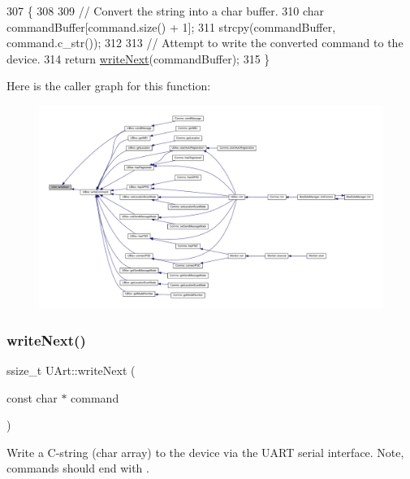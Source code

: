 \begin{DoxyCode}
307 \{
308 
309     \textcolor{comment}{// Convert the string into a char buffer.}
310     \textcolor{keywordtype}{char} commandBuffer[command.size() + 1];
311     strcpy(commandBuffer, command.c\_str());
312 
313     \textcolor{comment}{// Attempt to write the converted command to the device.}
314     \textcolor{keywordflow}{return} \hyperlink{class_u_art_aad1ddb133fe430a92527584eec2e674f}{writeNext}(commandBuffer);
315 \}
\end{DoxyCode}
Here is the caller graph for this function\+:\nopagebreak
\begin{figure}[H]
\begin{center}
\leavevmode
\includegraphics[width=350pt]{d9/d88/class_u_art_aad1ddb133fe430a92527584eec2e674f_icgraph}
\end{center}
\end{figure}
\mbox{\label{class_u_art_a6353ec5c21b038ca034bacaca8873713}} 
\subsubsection{\texorpdfstring{write\+Next()}{writeNext()}\hspace{0.1cm}{\footnotesize\ttfamily [2/2]}}
{\footnotesize\ttfamily ssize\+\_\+t U\+Art\+::write\+Next (\begin{DoxyParamCaption}\item[{const char $\ast$}]{command }\end{DoxyParamCaption})}

Write a C-\/string (char array) to the device via the U\+A\+RT serial interface. Note, commands should end with .


